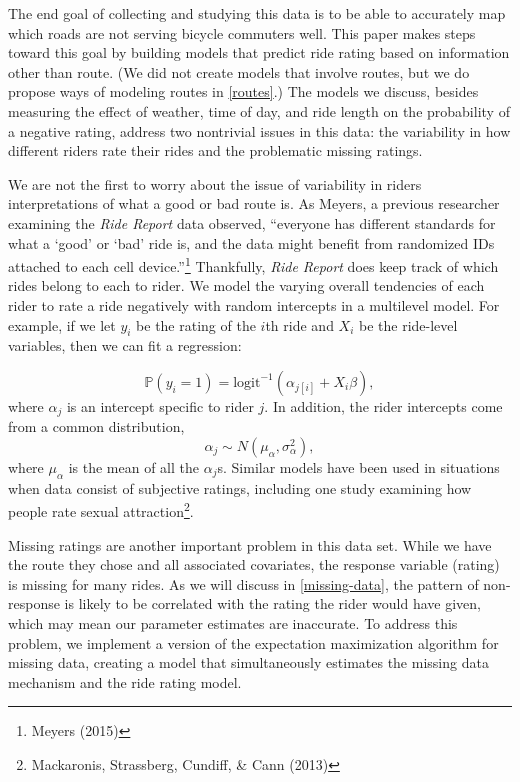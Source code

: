 \documentclass[12pt,twoside]{reedthesis}
\begin{document}
  The end goal of collecting and studying this data is to be able to
  accurately map which roads are not serving bicycle commuters well. This
  paper makes steps toward this goal by building models that predict ride
  rating based on information other than route. (We did not create models
  that involve routes, but we do propose ways of modeling routes in
  \autoref{routes}.) The models we discuss, besides measuring the effect
  of weather, time of day, and ride length on the probability of a
  negative rating, address two nontrivial issues in this data: the
  variability in how different riders rate their rides and the problematic
  missing ratings.
  
  We are not the first to worry about the issue of variability in riders
  interpretations of what a good or bad route is. As Meyers, a previous
  researcher examining the \textit{Ride Report} data observed, ``everyone
  has different standards for what a `good' or `bad' ride is, and the data
  might benefit from randomized IDs attached to each cell
  device.''\footnote{Meyers (2015)} Thankfully, \emph{Ride Report} does
  keep track of which rides belong to each to rider. We model the varying
  overall tendencies of each rider to rate a ride negatively with random
  intercepts in a multilevel model. For example, if we let \(y_i\) be the
  rating of the \(i\)th ride and \(X_i\) be the ride-level variables, then
  we can fit a regression:
  
  \[\mathbb{P}(y_i = 1) = \text{logit}^{-1}
  \left( \alpha_{j[i]} +  X_i \beta \right) ,\] where \(\alpha_j\) is an
  intercept specific to rider \(j\). In addition, the rider intercepts
  come from a common distribution,
  \[\alpha_j \sim N (\mu_\alpha, \sigma^2_\alpha),\] where \(\mu_\alpha\)
  is the mean of all the \(\alpha_j\)s. Similar models have been used in
  situations when data consist of subjective ratings, including one study
  examining how people rate sexual attraction\footnote{Mackaronis,
    Strassberg, Cundiff, \& Cann (2013)}.
  
  Missing ratings are another important problem in this data set. While we
  have the route they chose and all associated covariates, the response
  variable (rating) is missing for many rides. As we will discuss in
  \autoref{missing-data}, the pattern of non-response is likely to be
  correlated with the rating the rider would have given, which may mean
  our parameter estimates are inaccurate. To address this problem, we
  implement a version of the expectation maximization algorithm for
  missing data, creating a model that simultaneously estimates the missing
  data mechanism and the ride rating model.
  
\end{document}
